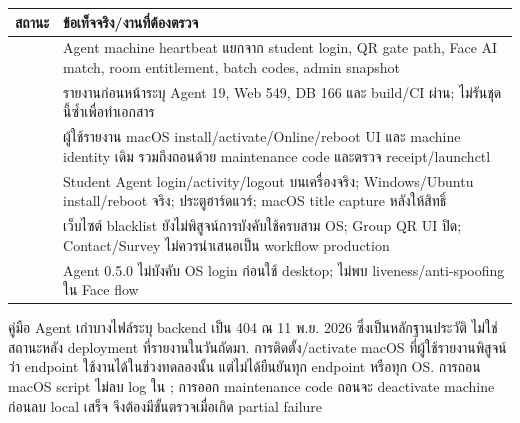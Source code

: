 \begin{longtable}{L{47mm}L{107mm}}
\toprule สถานะ & ข้อเท็จจริง/งานที่ต้องตรวจ \\ \midrule\endhead
{} & Agent machine heartbeat แยกจาก student login, QR gate path, Face AI match, room entitlement, batch codes, admin snapshot \\
 & รายงานก่อนหน้าระบุ Agent 19, Web 549, DB 166 และ build/CI ผ่าน; ไม่รันชุดนี้ซ้ำเพื่อทำเอกสาร \\
 & ผู้ใช้รายงาน macOS install/activate/Online/reboot UI และ machine identity เดิม รวมถึงถอนด้วย maintenance code และตรวจ receipt/launchctl \\
 & Student Agent login/activity/logout บนเครื่องจริง; Windows/Ubuntu install/reboot จริง; ประตูฮาร์ดแวร์; macOS title capture หลังให้สิทธิ์ \\
 & เว็บไซต์ blacklist ยังไม่พิสูจน์การบังคับใช้ครบสาม OS; Group QR UI ปิด; Contact/Survey ไม่ควรนำเสนอเป็น workflow production \\
 & Agent 0.5.0 ไม่บังคับ OS login ก่อนใช้ desktop; ไม่พบ liveness/anti-spoofing ใน Face flow \\
\bottomrule
\end{longtable}
คู่มือ Agent เก่าบางไฟล์ระบุ backend  เป็น 404 ณ 11 พ.ย. 2026 ซึ่งเป็นหลักฐานประวัติ ไม่ใช่สถานะหลัง deployment ที่รายงานในวันถัดมา. การติดตั้ง/activate macOS ที่ผู้ใช้รายงานพิสูจน์ว่า endpoint ใช้งานได้ในช่วงทดลองนั้น แต่ไม่ได้ยืนยันทุก endpoint หรือทุก OS. การถอน macOS script ไม่ลบ log ใน ; การออก maintenance code ถอนจะ deactivate machine ก่อนลบ local เสร็จ จึงต้องมีขั้นตรวจเมื่อเกิด partial failure
